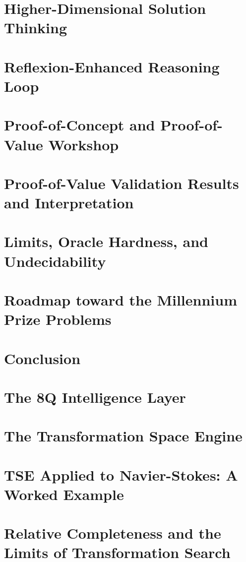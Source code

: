 \documentclass[11pt,a4paper]{article}
\begin{document}
\section{Higher-Dimensional Solution Thinking}


\section{Reflexion-Enhanced Reasoning Loop}


\section{Proof-of-Concept and Proof-of-Value Workshop}


\section{Proof-of-Value Validation Results and Interpretation}


\section{Limits, Oracle Hardness, and Undecidability}


\section{Roadmap toward the Millennium Prize Problems}


\section{Conclusion}




\section{The 8Q Intelligence Layer}


\section{The Transformation Space Engine}


\section{TSE Applied to Navier-Stokes: A Worked Example}


\section{Relative Completeness and the Limits of Transformation Search}

\end{document}

